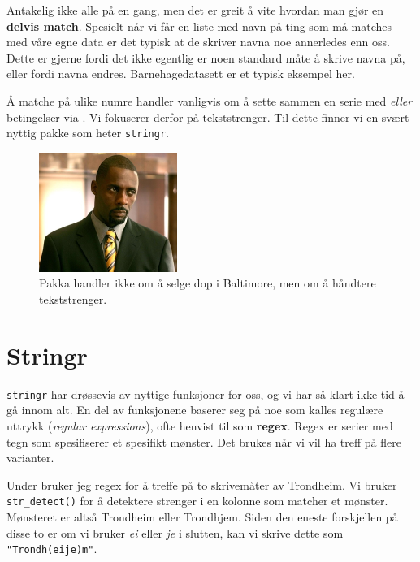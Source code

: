 \documentclass[
  letterpaper,
  DIV=11,
  numbers=noendperiod]{scrreprt}
\begin{document}
Antakelig ikke alle på en gang, men det er greit å vite hvordan man gjør
en \textbf{delvis match}. Spesielt når vi får en liste med navn på ting
som må matches med våre egne data er det typisk at de skriver navna noe
annerledes enn oss. Dette er gjerne fordi det ikke egentlig er noen
standard måte å skrive navna på, eller fordi navna endres.
Barnehagedatasett er et typisk eksempel her.

Å matche på ulike numre handler vanligvis om å sette sammen en serie med
\emph{eller} betingelser via \texttt{\textbar{}}. Vi fokuserer derfor på
tekststrenger. Til dette finner vi en svært nyttig pakke som heter
\texttt{stringr}.

\begin{figure}

{\centering \includegraphics[width=0.4\textwidth,height=\textheight]{./img/Stringer_Bell.jpg}

}

\caption{Pakka handler ikke om å selge dop i Baltimore, men om å
håndtere tekststrenger.}

\end{figure}

\hypertarget{stringr}{%
\section{Stringr}\label{stringr}}

\texttt{stringr} har drøssevis av nyttige funksjoner for oss, og vi har
så klart ikke tid å gå innom alt. En del av funksjonene baserer seg på
noe som kalles regulære uttrykk (\emph{regular expressions}), ofte
henvist til som \textbf{regex}. Regex er serier med tegn som
spesifiserer et spesifikt mønster. Det brukes når vi vil ha treff på
flere varianter.

Under bruker jeg regex for å treffe på to skrivemåter av Trondheim. Vi
bruker \texttt{str\_detect()} for å detektere strenger i en kolonne som
matcher et mønster. Mønsteret er altså Trondheim eller Trondhjem. Siden
den eneste forskjellen på disse to er om vi bruker \emph{ei} eller
\emph{je} i slutten, kan vi skrive dette som
\texttt{"Trondh(ei\textbar{}je)m"}.
\end{document}
